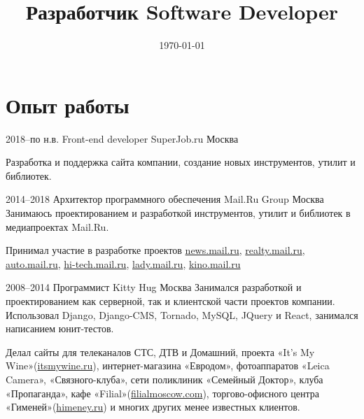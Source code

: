 \documentclass[11pt,a4paper,sans]{moderncv}
\title
    {\lang
        {Разработчик}
        {Software Developer}}
\date{\today}
\newcommand{\lang}[2]{#1}
\begin{document}
\makecvtitle


\section
    {\lang
        {Опыт работы}
        {Work Experience}}


\cventry
    {2018--\lang
        {по н.в.}
        {Present}}
    {\lang
        {Front-end developer}
        {Фронтенд разработчик}}
    {SuperJob.ru}
    {\lang
        {Москва}
        {Moscow}}
    {}
    {\lang
        {Разработка и поддержка сайта компании, создание новых инструментов, утилит и библиотек.}
        {todo}

\cventry
    {2014--2018}
    {\lang
        {Архитектор программного обеспечения}
        {Software Architect}}
    {Mail.Ru Group}
    {\lang
        {Москва}
        {Moscow}}
    {}
    {\lang
        {Занимаюсь проектированием и разработкой инструментов, утилит и библиотек в медиапроектах Mail.Ru.}
        {Design and develop tools, utilities and libraries for Media Projects Mail.Ru}}

\cvlistitem
    {\lang 
        {Принимал участие в разработке проектов \href{https://news.mail.ru}{news.mail.ru}, \href{https://realty.mail.ru}{realty.mail.ru}, \href{https://auto.mail.ru}{auto.mail.ru}, \href{https://hi-tech.mail.ru}{hi-tech.mail.ru}, \href{https://lady.mail.ru}{lady.mail.ru}, \href{https://kino.mail.ru}{kino.mail.ru}}
        {Actively participated in development of such projects as \href{https://news.mail.ru}{news.mail.ru}, \href{https://realty.mail.ru}{realty.mail.ru}, \href{https://auto.mail.ru}{auto.mail.ru}, \href{https://hi-tech.mail.ru}{hi-tech.mail.ru}, \href{https://lady.mail.ru}{lady.mail.ru}, \href{https://kino.mail.ru}{kino.mail.ru}}\newline}


\cventry
    {2008--2014}
    {\lang
        {Программист}
        {Software Developer}}
    {Kitty Hug}
    {\lang
        {Москва}
        {Moscow}}
    {}
    {\lang
        {Занимался разработкой и проектированием как серверной, так и клиентской части проектов компании. Использовал Django, Django-CMS, Tornado, MySQL, JQuery и React, занимался написанием юнит-тестов.}
        {Designed and developed both server and client side of company projects. Used such tools as Django web framework, Django-CMS, Tornado, MySQL, JQuery and React}}

\cvlistitem
    {\lang
        {Делал сайты для телеканалов СТС, ДТВ и Домашний, проекта «It's My Wine»(\href{http://itsmywine.ru}{itsmywine.ru}), интернет-магазина «Евродом», фотоаппаратов «Leica Camera», «Связного-клуба», сети поликлиник «Семейный Доктор», клуба «Пропаганда», кафе «Filial»(\href{http://filialmoscow.com/ru/}{filialmoscow.com}), торгово-офисного центра «Гименей»(\href{http://himeney.ru}{himeney.ru}) и многих других менее известных клиентов.}
        {Made websites}}

}
\end{document}
